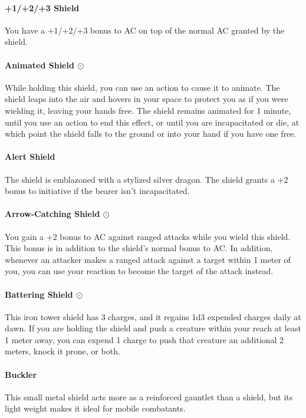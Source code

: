     \paragraph{+1/+2/+3 Shield}
        You have a +1/+2/+3 bonus to AC on top of the normal AC granted by the shield.
    \paragraph{Animated Shield $\odot$}
        While holding this shield, you can use an action to cause it to animate.
        The shield leaps into the air and hovers in your space to protect you as if you were wielding it, leaving your hands free.
        The shield remains animated for 1 minute, until you use an action to end this effect, or until you are incapacitated or die, at which point the shield falls to the ground or into your hand if you have one free.
    \paragraph{Alert Shield}
        The shield is emblazoned with a stylized silver dragon.
        The shield grants a +2 bonus to initiative if the bearer isn't incapacitated.
    \paragraph{Arrow-Catching Shield $\odot$}
        You gain a +2 bonus to AC against ranged attacks while you wield this shield.
        This bonus is in addition to the shield's normal bonus to AC.
        In addition, whenever an attacker makes a ranged attack against a target within 1 meter of you, you can use your reaction to become the target of the attack instead.
    \paragraph{Battering Shield $\odot$}
        This iron tower shield has 3 charges, and it regains 1d3 expended charges daily at dawn.
        If you are holding the shield and push a creature within your reach at least 1 meter away, you can expend 1 charge to push that creature an additional 2 meters, knock it prone, or both.
    \paragraph{Buckler}
        This small metal shield acts more as a reinforced gauntlet than a shield, but its light weight makes it ideal for mobile combatants.
